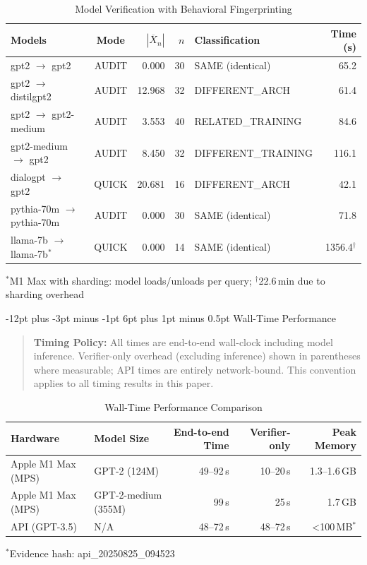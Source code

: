 \documentclass[11pt]{article}
\makeatletter
\renewcommand\subsection{\@startsection{subsection}{2}{\z@}%
  {-12pt plus -3pt minus -1pt}%
  {6pt plus 1pt minus 0.5pt}%
  {\normalfont\large\bfseries}}
\makeatother
\begin{document}
\begin{table}[ht!]
\centering
\caption{Model Verification with Behavioral Fingerprinting}
\label{tab:decisions}
\small
\begin{tabular}{@{}l c r r l r@{}}
\toprule
\textbf{Models} & \textbf{Mode} & \textbf{$|\overline{X}_n|$} & \textbf{$n$} & \textbf{Classification} & \textbf{Time (s)} \\
\midrule
gpt2 $\to$ gpt2 & AUDIT & 0.000 & 30 & SAME (identical) & 65.2 \\
gpt2 $\to$ distilgpt2 & AUDIT & 12.968 & 32 & DIFFERENT\_ARCH & 61.4 \\
gpt2 $\to$ gpt2-medium & AUDIT & 3.553 & 40 & RELATED\_TRAINING & 84.6 \\
gpt2-medium $\to$ gpt2 & AUDIT & 8.450 & 32 & DIFFERENT\_TRAINING & 116.1 \\
dialogpt $\to$ gpt2 & QUICK & 20.681 & 16 & DIFFERENT\_ARCH & 42.1 \\
pythia-70m $\to$ pythia-70m & AUDIT & 0.000 & 30 & SAME (identical) & 71.8 \\
llama-7b $\to$ llama-7b$^*$ & QUICK & 0.000 & 14 & SAME (identical) & 1356.4$^{\dagger}$ \\
\bottomrule
\end{tabular}

\vspace{3pt}
\footnotesize{$^*$M1 Max with sharding: model loads/unloads per query; $^{\dagger}$22.6\,min due to sharding overhead}
\end{table}

\subsection{Wall-Time Performance}

\begin{quote}
\footnotesize
\textbf{Timing Policy:} All times are end-to-end wall-clock including model inference. Verifier-only overhead (excluding inference) shown in parentheses where measurable; API times are entirely network-bound. This convention applies to all timing results in this paper.
\end{quote}

\begin{table}[ht!]
\centering
\caption{Wall-Time Performance Comparison}
\label{tab:wall-time}
\small
\begin{tabular}{l l r r r}
\toprule
\textbf{Hardware} & \textbf{Model Size} & \textbf{End-to-end Time} & \textbf{Verifier-only} & \textbf{Peak Memory} \\
\midrule
Apple M1 Max (MPS) & GPT-2 (124M) & 49--92\,s & 10--20\,s & 1.3--1.6\,GB \\
Apple M1 Max (MPS) & GPT-2-medium (355M) & 99\,s & 25\,s & 1.7\,GB \\
API (GPT-3.5) & N/A & 48--72\,s & 48--72\,s & <100\,MB$^*$ \\
\bottomrule
\end{tabular}

\vspace{3pt}
\footnotesize{$^*$Evidence hash: api\_20250825\_094523}
\end{table}
\end{document}
